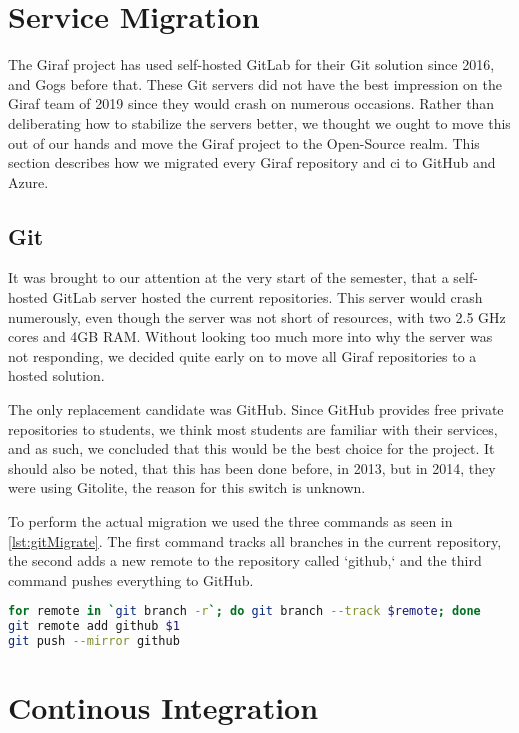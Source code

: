 \section{Service Migration}

The Giraf project has used self-hosted GitLab for their Git solution since 2016\cite{SW611F16}, and Gogs before that\cite{SW603F15}. These Git servers did not have the best impression on the Giraf team of 2019 since they would crash on numerous occasions. Rather than deliberating how to stabilize the servers better, we thought we ought to move this out of our hands and move the Giraf project to the Open-Source realm. This section describes how we migrated every Giraf repository and \gls{ci} to GitHub and Azure.

\subsection{Git}

It was brought to our attention at the very start of the semester, that a self-hosted GitLab server hosted the current repositories. This server would crash numerously, even though the server was not short of resources, with two 2.5 GHz cores and 4GB RAM. Without looking too much more into why the server was not responding, we decided quite early on to move all Giraf repositories to a hosted solution. 

The only replacement candidate was GitHub. Since GitHub provides free private repositories to students, we think most students are familiar with their services, and as such, we concluded that this would be the best choice for the project. It should also be noted, that this has been done before, in 2013\cite{SW601F13}, but in 2014, they were using Gitolite\cite{SW613F14}, the reason for this switch is unknown.

To perform the actual migration we used the three commands as seen in \autoref{lst:gitMigrate}. The first command tracks all branches in the current repository, the second adds a new remote to the repository called `github,` and the third command pushes everything to GitHub.

\begin{lstlisting}[language=bash,label={lst:gitMigrate},caption={Git Migration code}]
for remote in `git branch -r`; do git branch --track $remote; done
git remote add github $1
git push --mirror github
\end{lstlisting}

\section{Continous Integration}

